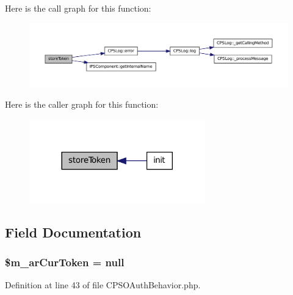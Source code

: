Here is the call graph for this function:\nopagebreak
\begin{figure}[H]
\begin{center}
\leavevmode
\includegraphics[width=400pt]{classCPSOAuthBehavior_ab53bf3a3bd85d4b1bef5f84fd9b1527c_cgraph}
\end{center}
\end{figure}




Here is the caller graph for this function:\nopagebreak
\begin{figure}[H]
\begin{center}
\leavevmode
\includegraphics[width=216pt]{classCPSOAuthBehavior_ab53bf3a3bd85d4b1bef5f84fd9b1527c_icgraph}
\end{center}
\end{figure}




\subsection{Field Documentation}
\hypertarget{classCPSOAuthBehavior_a69e9bc86943e578be80bb4319e3b7b61}{
\subsubsection[{\$m\_\-arCurToken}]{\setlength{\rightskip}{0pt plus 5cm}\$m\_\-arCurToken = null}}
\label{classCPSOAuthBehavior_a69e9bc86943e578be80bb4319e3b7b61}


Definition at line 43 of file CPSOAuthBehavior.php.

